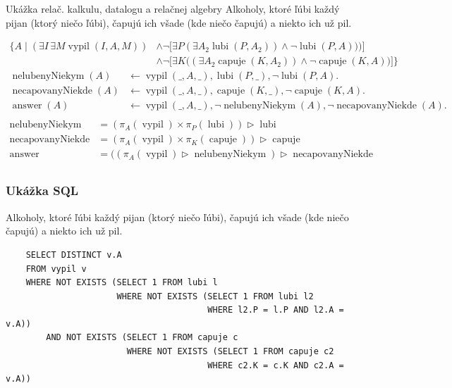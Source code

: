 \documentclass[12pt]{beamer}
\DeclareMathOperator{\antijoin}{\rhd}
\DeclareMathOperator{\lubi}{lubi}
\DeclareMathOperator{\capuje}{capuje}
\DeclareMathOperator{\vypil}{vypil}
\DeclareMathOperator{\answer}{answer}
\begin{document}
\begin{frame}{Ukážka relač. kalkulu, datalogu a relačnej algebry}
Alkoholy, ktoré ľúbi každý pijan (ktorý niečo ľúbi), čapujú ich všade (kde niečo čapujú) a niekto ich už pil.

{\scriptsize
\begin{align*}
\Big\{A\mid (\exists I\,\exists M\vypil(I, A, M))&\land \lnot \Big[\exists P (\exists A_2\lubi(P, A_2))\land\lnot\lubi(P, A))\Big)\Big]\\
&\land \lnot\Big[\exists K \Big((\exists A_2 \capuje(K, A_2))\land \lnot\capuje(K, A)\Big)\Big]\Big\}
\end{align*}
}
{\scriptsize
\begin{align*}
\operatorname{nelubenyNiekym}(A) &\leftarrow \vypil(\_, A, \_), \lubi(P, \_), \lnot\lubi(P, A).\\
\operatorname{necapovanyNiekde}(A) &\leftarrow \vypil(\_, A, \_), \capuje(K, \_), \lnot\capuje(K, A).\\
\answer(A) &\leftarrow \vypil(\_, A, \_), \lnot\operatorname{nelubenyNiekym}(A), \lnot\operatorname{necapovanyNiekde}(A).\\
\end{align*}
}
\vskip -2mm
\vskip -2mm
{\scriptsize
\begin{align*}
\operatorname{nelubenyNiekym} & = (\pi_A(\vypil)\times \pi_P(\lubi))\antijoin \lubi\\
\operatorname{necapovanyNiekde} & = (\pi_A(\vypil)\times \pi_K(\capuje))\antijoin \capuje\\
\answer & = ((\pi_A(\vypil) \antijoin \operatorname{nelubenyNiekym})\antijoin \operatorname{necapovanyNiekde}\\
\end{align*}
}
\end{frame}

\begin{frame}[fragile]
\frametitle{Ukážka SQL}
Alkoholy, ktoré ľúbi každý pijan (ktorý niečo ľúbi), čapujú ich všade (kde niečo čapujú) a niekto ich už pil.

{\scriptsize
\begin{verbatim}
    SELECT DISTINCT v.A
    FROM vypil v
    WHERE NOT EXISTS (SELECT 1 FROM lubi l
                      WHERE NOT EXISTS (SELECT 1 FROM lubi l2
                                        WHERE l2.P = l.P AND l2.A = v.A))
        AND NOT EXISTS (SELECT 1 FROM capuje c
                        WHERE NOT EXISTS (SELECT 1 FROM capuje c2
                                        WHERE c2.K = c.K AND c2.A = v.A))
\end{verbatim}
}
\end{frame}
\end{document}
